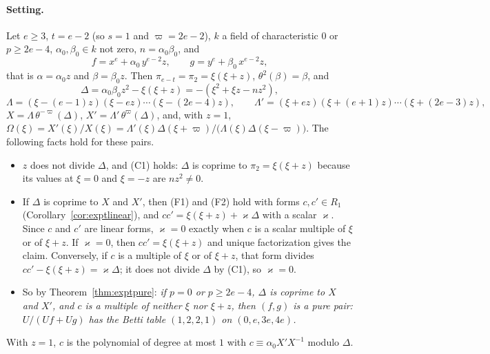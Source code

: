 \documentclass[11pt]{article}
\theoremstyle{definition}
\theoremstyle{remark}
\begin{document}
\paragraph{Setting.} Let $e\ge3$, $t=e-2$ (so $s=1$ and $\varpi=2e-2$), $k$ a field of characteristic $0$ or $p\ge2e-4$, $\alpha_0,\beta_0\in k$ not zero, $n=\alpha_0\beta_0$, and
\[
f=x^e+\alpha_0\,y^{e-2}z,\qquad g=y^e+\beta_0\,x^{e-2}z,
\]
that is $\alpha=\alpha_0z$ and $\beta=\beta_0z$. Then $\pi_{e-t}=\pi_2=\xi(\xi+z)$, $\theta^2(\beta)=\beta$, and
\[
\Delta=\alpha_0\beta_0z^2-\xi(\xi+z)=-(\xi^2+\xi z-nz^2),
\]
\[
\Lambda=(\xi-(e-1)z)(\xi-ez)\cdots(\xi-(2e-4)z),\qquad\Lambda'=(\xi+ez)(\xi+(e+1)z)\cdots(\xi+(2e-3)z),
\]
$X=\Lambda\,\theta^{-\varpi}(\Delta)$, $X'=\Lambda'\,\theta^{\varpi}(\Delta)$, and, with $z=1$, $\Omega(\xi)=X'(\xi)/X(\xi)=\Lambda'(\xi)\Delta(\xi+\varpi)\big/\bigl(\Lambda(\xi)\Delta(\xi-\varpi)\bigr)$. The following facts hold for these pairs.
\begin{itemize}
\item $z$ does not divide $\Delta$, and (C1) holds: $\Delta$ is coprime to $\pi_2=\xi(\xi+z)$ because its values at $\xi=0$ and $\xi=-z$ are $nz^2\ne0$.
\item If $\Delta$ is coprime to $X$ and $X'$, then (F1) and (F2) hold with forms $c,c'\in R_1$ (Corollary~\ref{cor:exptlinear}), and $cc'=\xi(\xi+z)+\varkappa\Delta$ with a scalar $\varkappa$. Since $c$ and $c'$ are linear forms, $\varkappa=0$ exactly when $c$ is a scalar multiple of $\xi$ or of $\xi+z$. If $\varkappa=0$, then $cc'=\xi(\xi+z)$ and unique factorization gives the claim. Conversely, if $c$ is a multiple of $\xi$ or of $\xi+z$, that form divides $cc'-\xi(\xi+z)=\varkappa\Delta$; it does not divide $\Delta$ by (C1), so $\varkappa=0$.
\item So by Theorem~\ref{thm:exptpure}: \emph{if $p=0$ or $p\ge2e-4$, $\Delta$ is coprime to $X$ and $X'$, and $c$ is a multiple of neither $\xi$ nor $\xi+z$, then $(f,g)$ is a pure pair: $U/(Uf+Ug)$ has the Betti table $(1,2,2,1)$ on $(0,e,3e,4e)$.}
\end{itemize}
With $z=1$, $c$ is the polynomial of degree at most $1$ with $c\equiv\alpha_0X'X^{-1}$ modulo $\Delta$.
\end{document}
